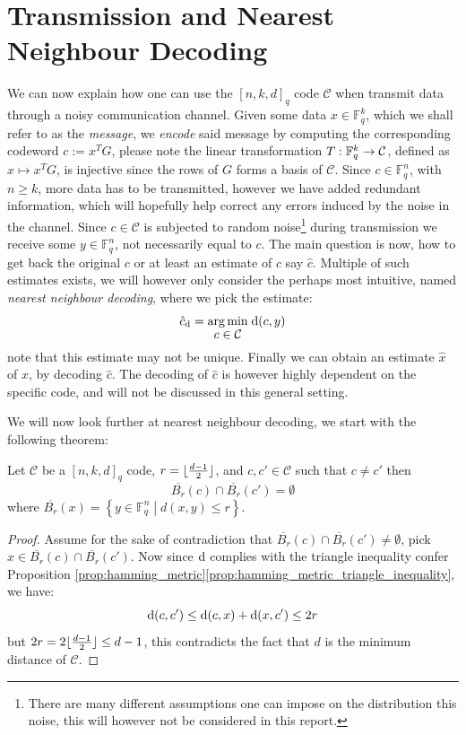 \section{Transmission and Nearest Neighbour Decoding}\label{sec:transmission_and_nearest_neighbour_decoding}
We can now explain how one can use the $[n,k,d]_{q}$ code $\mathcal{C}$ when transmit data through a noisy communication channel.
Given some data $x \in \mathbb{F}_{q}^{k}$, which we shall refer to as the \textit{message}, we \textit{encode} said message by computing the corresponding codeword $c := x^{T}G$, please note the linear transformation $T: \mathbb{F}^k_q \to \mathcal{C}$, defined as $x \mapsto x^{T}G$, is injective since the rows of $G$ forms a basis of $\mathcal{C}$.
Since $c \in \mathbb{F}_q^{n}$, with $n \geq k$, more data has to be transmitted, however we have added redundant information, which will hopefully help correct any errors induced by the noise in the channel.
Since $c \in \mathcal{C}$ is subjected to random noise\footnote{There are many different assumptions one can impose on the distribution this noise, this will however not be considered in this report.} during transmission we receive some $y \in \mathbb{F}_q^n$, not necessarily equal to $c$.
The main question is now, how to get back the original $c$ or at least an estimate of $c$ say $\hat{c}$.
Multiple of such estimates exists, we will however only consider the perhaps most intuitive, named \textit{nearest neighbour decoding}, where we pick the estimate:
\begin{equation*}
   \hat{c}_{\mathrm{d}} = \underset{\displaystyle c \in \mathcal{C}}{\arg\min} \; \mathrm{d}(c, y)
\end{equation*}
note that this estimate may not be unique. Finally we can obtain an estimate $\hat{x}$ of $x$, by decoding $\hat{c}$. The decoding of $\hat{c}$ is however highly dependent on the specific code, and will not be discussed in this general setting.

We will now look further at nearest neighbour decoding, we start with the following theorem:
\begin{theorem}\label{thm:disjoint_closed_balls}
  Let $\mathcal{C}$ be a $[n, k, d]_{q}$ code, $r = \lfloor\frac{d-1}{2}\rfloor$, and $c, c' \in \mathcal{C}$ such that $c \neq c'$ then
  \begin{equation*}
     \overline{B_{r}}(c) \cap \overline{B_r}(c') = \emptyset
  \end{equation*}
  where $\overline{B_{r}}(x) = \left\{y \in \mathbb{F}_q^n \middle| d(x, y) \leq r\right\}$.
\end{theorem}
\begin{proof}
  Assume for the sake of contradiction that $\overline{B_{r}}(c) \cap \overline{B_r}(c') \neq \emptyset$, pick $x \in \overline{B_{r}}(c) \cap \overline{B_r}(c')$. Now since $\mathrm{d}$ complies with the triangle inequality confer Proposition \ref{prop:hamming_metric}\ref{prop:hamming_metric_triangle_inequality}, we have:
  \begin{equation*}
    \mathrm{d}(c, c') \leq \mathrm{d}(c, x) + \mathrm{d}(x,c') \leq 2r
  \end{equation*}
  but $2r = 2 \lfloor\frac{d-1}{2}\rfloor \leq d - 1$, this contradicts the fact that $d$ is the minimum distance of $\mathcal{C}$.
\end{proof}

